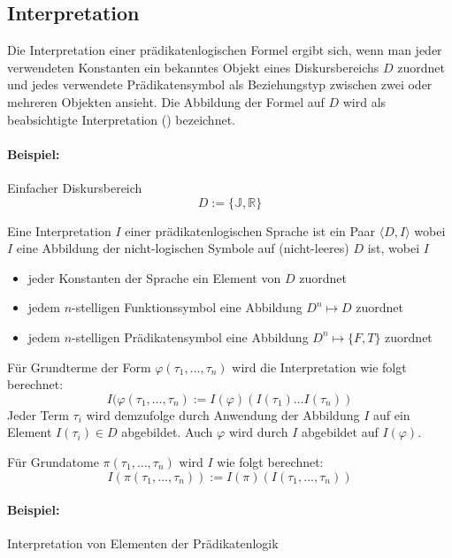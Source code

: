 \documentclass[a4paper,twoside,DIV15,BCOR12mm]{scrbook}
\begin{document}
\subsection{Interpretation}

Die Interpretation einer prädikatenlogischen Formel ergibt sich, wenn man jeder verwendeten Konstanten 
ein bekanntes Objekt eines Diskursbereichs $D$ zuordnet und jedes verwendete Prädikatensymbol als Beziehungstyp zwischen 
zwei oder mehreren Objekten ansieht. Die Abbildung der Formel auf $D$ wird als beabsichtigte Interpretation 
() bezeichnet.

\def\J{\mathbb{J}}
\def\R{\mathbb{R}}

\paragraph{Beispiel:} Einfacher Diskursbereich
$$D := \{\J,\R\}$$

Eine Interpretation $I$ einer prädikatenlogischen Sprache ist ein Paar $\langle D,I\rangle$ wobei $I$ eine Abbildung der
nicht-logischen Symbole auf (nicht-leeres) $D$ ist, wobei $I$

\begin{itemize}
\item jeder Konstanten der Sprache ein Element von $D$ zuordnet
\item jedem $n$-stelligen Funktionssymbol eine Abbildung $D^n \mapsto D$ zuordnet
\item jedem $n$-stelligen Prädikatensymbol eine Abbildung $D^n \mapsto \{F,T\}$ zuordnet
\end{itemize}

Für Grundterme der Form $\varphi (\tau_1, \ldots, \tau_n)$ wird die Interpretation wie folgt berechnet:
$$I (\varphi (\tau_1, \ldots, \tau_n) := I(\varphi)(I(\tau_1) \ldots I(\tau_n))$$
Jeder Term $\tau_i$ wird demzufolge durch Anwendung der Abbildung $I$ auf ein Element $I(\tau_i) \in D$ abgebildet.
Auch $\varphi$ wird durch $I$ abgebildet auf $I(\varphi)$.

Für Grundatome $\pi(\tau_1, \ldots, \tau_n)$ wird $I$ wie folgt berechnet:
$$I(\pi(\tau_1, \ldots, \tau_n)) := I(\pi)(I(\tau_1, \ldots, \tau_n))$$

\paragraph{Beispiel:} Interpretation von Elementen der Prädikatenlogik
\end{document}
